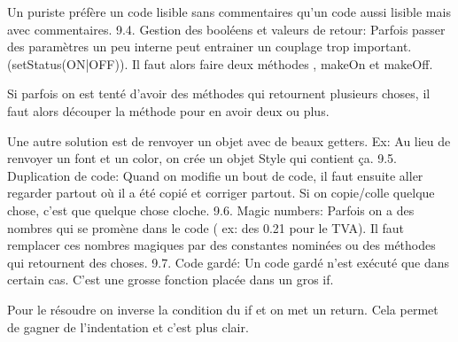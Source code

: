 Un puriste préfère un code lisible sans commentaires qu’un code aussi lisible mais avec commentaires.
9.4. Gestion des booléens et valeurs de retour:
Parfois passer des paramètres un peu interne peut entrainer un couplage trop important. (setStatus(ON|OFF)). Il faut alors faire deux méthodes , makeOn et makeOff.

Si parfois on est tenté d’avoir des méthodes qui retournent plusieurs choses, il faut alors découper la méthode pour en avoir deux ou plus.

Une autre solution est de renvoyer un objet avec de beaux getters. Ex: Au lieu de renvoyer un font et un color, on crée un objet Style qui contient ça.
9.5. Duplication de code:
Quand on modifie un bout de code, il faut ensuite aller regarder partout où il a été copié et corriger partout. Si on copie/colle quelque chose, c’est que quelque chose cloche.
9.6. Magic numbers:
Parfois on a des nombres qui se promène dans le code ( ex: des 0.21 pour le TVA).
Il faut remplacer ces nombres magiques par des constantes nominées ou des méthodes qui retournent des choses.
9.7. Code gardé:
Un code gardé n’est exécuté que dans certain cas. C’est une grosse fonction placée dans un gros if.

Pour le résoudre on inverse la condition du if et on met un return.
Cela permet de gagner de l’indentation et c’est plus clair.